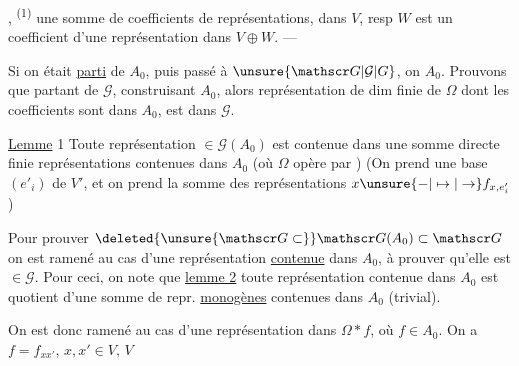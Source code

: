 , \textsuperscript{(1)} une somme de  coefficients de
représentations, dans $V$, resp $W$ est un
coefficient d'une représentation dans $V\oplus W$. ---

Si on était \uline{parti} de $A_0$, puis passé à $\unsure{\mathscr G|\mathcal G|G}$,
on  $A_0$. Prouvons que partant de
$\mathscr G$, construisant $A_0$, alors  représentation
de dim finie de $\Omega$ dont les coefficients
sont dans $A_0$, est dans $\mathscr G$. 

\uline{Lemme} 1 Toute représentation $\in\mathscr G(A_0)$ est
contenue dans une somme directe finie
représentations contenues dans $A_0$ (où
$\Omega$ opère par ) (On prend
une base $(e'_i)$ de $V'$, et on
prend la somme des représentations $x\unsure{-|\mapsto|\to} f_{x,e'_i}$)

Pour prouver $\deleted{\unsure{\mathscr G\subset}}\mathscr G(A_0)\subset\mathscr G$ on est ramené
au cas d'une représentation \uline{contenue}
dans $A_0$, à prouver qu'elle est $\in\mathscr G$.
Pour ceci, on note que \uline{lemme 2} toute
représentation  contenue dans $A_0$ est quotient
d'une somme  de repr. \uline{monogènes}
contenues dans $A_0$ (trivial).

On est donc ramené au cas d'une
représentation dans $\Omega*f$, où $f\in A_0$.
On a $f=f_{xx'}$, $x,x'\in V$, $V$  
